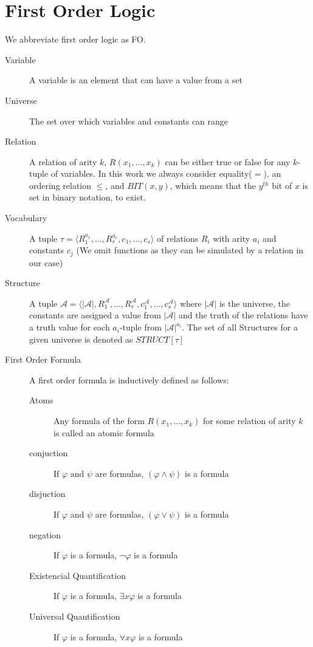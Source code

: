 \section{First Order Logic}\label{sec:first-order-logic}
We abbreviate first order logic as FO\@.
\begin{description}
    \item[Variable] A variable is an element that can have a value from a set
    \item[Universe] The set over which variables and constants can range
    \item[Relation] A relation of arity $k$, $R(x_1, \dots, x_k)$ can be either true or false for any $k$-tuple of variables. In this work we always consider equality($=$), an ordering relation $\leq$, and $BIT(x, y)$, which means that the $y^{th}$ bit of $x$ is set in binary notation, to exist.
    \item[Vocabulary] A tuple $\tau = \langle R_1^{a_1}, \dots, R_r^{a_r}, c_1, \dots, c_s \rangle$ of relations $R_i$ with arity $a_i$ and constants $c_j$ (We omit functions as they can be simulated by a relation in our case)
    \item[Structure] A tuple $\mathcal{A} = \langle |\mathcal{A}|, R_1^{\mathcal{A}}, \dots, R_r^{\mathcal{A}}, c_1^{\mathcal{A}}, \dots, c_s^{\mathcal{A}} \rangle$ where $|\mathcal{A}|$ is the universe, the constants are assigned a value from $|\mathcal{A}|$ and the truth of the relations have a truth value for each $a_i$-tuple from $|\mathcal{A}|^{a_i}$. The set of all Structures for a given universe is denoted as $STRUCT[\tau]$
    \item[First Order Formula] A first order formula is inductively defined as follows:
    \begin{description}
        \item[Atoms] Any formula of the form $R(x_1, \dots, x_k)$ for some relation of arity $k$ is called an atomic formula
        \item[conjuction] If $\varphi$ and $\psi$ are formulas, $(\varphi \land \psi)$ is a formula
        \item[disjuction] If $\varphi$ and $\psi$ are formulas, $(\varphi \lor \psi)$ is a formula
        \item[negation] If $\varphi$ is a formula, $\lnot \varphi$ is a formula
        \item[Existencial Quantification] If $\varphi$ is a formula, $\exists x \varphi$ is a formula
        \item[Universal Quantification] If $\varphi$ is a formula, $\forall x \varphi$ is a formula

\end{description}
\end{description}

